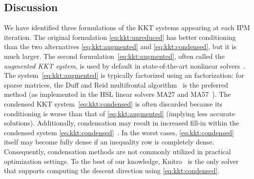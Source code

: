 \subsection{Discussion}
We have identified three formulations of the KKT systems
appearing at each IPM iteration. The original formulation
\eqref{eq:kkt:unreduced} has better
conditioning than the two alternatives \eqref{eq:kkt:augmented} and
\eqref{eq:kkt:condensed}, but it is much larger.
The second formulation~\eqref{eq:kkt:augmented}, often called the \textit{augmented KKT system}, is
used by default in state-of-the-art nonlinear solvers~\cite{wachter2006implementation,waltz2006interior}.
The system~\eqref{eq:kkt:augmented} is typically factorized using an \lblt factorization: for sparse matrices, the Duff and Reid
multifrontal algorithm~\cite{duff1983multifrontal} is the preferred method (as implemented in the HSL linear solvers MA27 and MA57~\cite{duff2004ma57}).
The condensed KKT system~\eqref{eq:kkt:condensed} is often discarded because
its conditioning is worse
than that of \eqref{eq:kkt:augmented} (implying less accurate solutions).
Additionally, condensation may result in increased fill-in within the condensed system \eqref{eq:kkt:condensed}~\cite[Section 19.3, p.571]{nocedal_numerical_2006}.
In the worst cases, \eqref{eq:kkt:condensed} itself may become fully dense if an inequality row is completely dense.
Consequently, condensation methods are not commonly utilized in practical optimization settings.
To the best of our knowledge, Knitro~\cite{waltz2006interior} is the only solver that supports computing the descent direction using \eqref{eq:kkt:condensed}.


